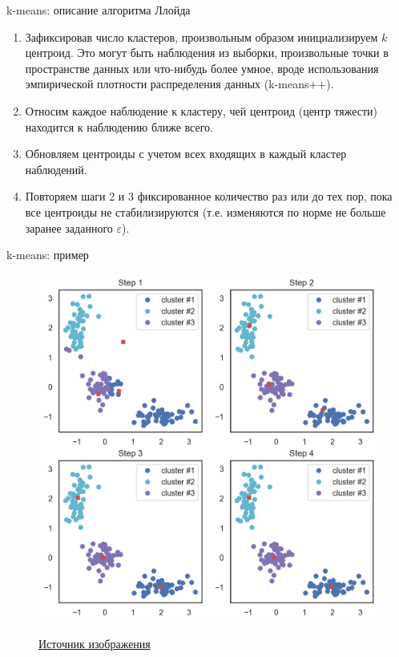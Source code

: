 \documentclass{beamer}
\begin{document}
\begin{frame}{k-means: описание алгоритма Ллойда}
    \small
    
    \begin{enumerate}
        \item Зафиксировав число кластеров, произвольным образом инициализируем $k$ центроид. Это могут быть наблюдения из выборки, произвольные точки в пространстве данных или что-нибудь более умное, вроде использования эмпирической плотности распределения данных (k-means++).
        \item Относим каждое наблюдение к кластеру, чей центроид (центр тяжести) находится к наблюдению ближе всего.
        \item Обновляем центроиды с учетом всех входящих в каждый кластер наблюдений.
        \item Повторяем шаги 2 и 3 фиксированное количество раз или до тех пор, пока все центроиды не стабилизируются (т.е. изменяются по норме не больше заранее заданного $\varepsilon$).
    \end{enumerate}
        
\end{frame}

\begin{frame}{k-means: пример}
    \small
    
    \begin{figure}
        \centering
        \includegraphics[width=0.6\linewidth]{kmeans.png}
        
        \href{https://mlcourse.ai/book/topic07/topic7_pca_clustering.html
}{Источник изображения}
    \end{figure}
\end{frame}
\end{document}

